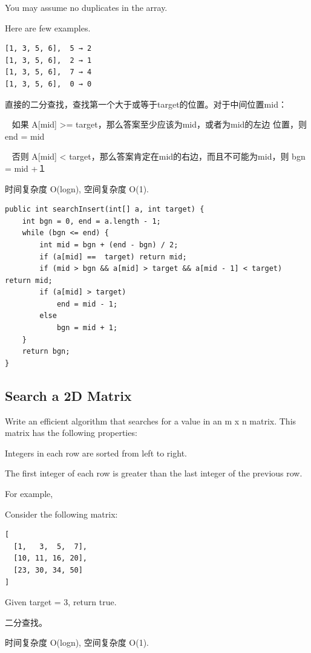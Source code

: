 \documentclass[12pt]{book}
\begin{document}
You may assume no duplicates in the array.

Here are few examples.
\lstset{language=java,label= ,caption= ,numbers=none}
\begin{lstlisting}
[1, 3, 5, 6],  5 → 2
[1, 3, 5, 6],  2 → 1
[1, 3, 5, 6],  7 → 4
[1, 3, 5, 6],  0 → 0
\end{lstlisting}

直接的二分查找，查找第一个大于或等于target的位置。对于中间位置mid：

~ 如果 A[mid] >= target，那么答案至少应该为mid，或者为mid的左边
位置，则 end = mid

~ 否则 A[mid] < target，那么答案肯定在mid的右边，而且不可能为mid，则
bgn = mid +１

时间复杂度 O(logn), 空间复杂度 O(1). 
\lstset{language=java,label= ,caption= ,numbers=none}
\begin{lstlisting}
public int searchInsert(int[] a, int target) {
    int bgn = 0, end = a.length - 1;
    while (bgn <= end) {
        int mid = bgn + (end - bgn) / 2;
        if (a[mid] ==  target) return mid;
        if (mid > bgn && a[mid] > target && a[mid - 1] < target) return mid;
        if (a[mid] > target)
            end = mid - 1;
        else
            bgn = mid + 1;
    }
    return bgn;
}
\end{lstlisting}

\subsection{Search a 2D Matrix}
\label{sec-8-1-3}
Write an efficient algorithm that searches for a value in an m x n matrix. This matrix has the following properties:

Integers in each row are sorted from left to right.

The first integer of each row is greater than the last integer of the previous row.

For example,

Consider the following matrix:
\lstset{language=java,label= ,caption= ,numbers=none}
\begin{lstlisting}
[
  [1,   3,  5,  7],
  [10, 11, 16, 20],
  [23, 30, 34, 50]
]
\end{lstlisting}

Given target = 3, return true.

二分查找。

时间复杂度 O(logn), 空间复杂度 O(1). 
\end{document}
